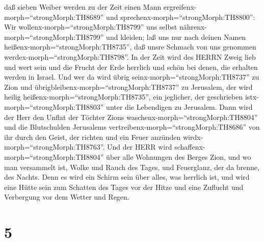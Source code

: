  daß sieben Weiber werden zu der Zeit einen Mann
ergreifenx-morph=``strongMorph:TH8689'' und
sprechenx-morph=``strongMorph:TH8800'': Wir
wollenx-morph=``strongMorph:TH8799'' uns selbst
nährenx-morph=``strongMorph:TH8799'' und kleiden; laß uns nur nach
deinen Namen heißenx-morph=``strongMorph:TH8735'', daß unsre Schmach von
uns genommen werdex-morph=``strongMorph:TH8798''.  In der
Zeit wird des HERRN Zweig lieb und wert sein und die Frucht der Erde
herrlich und schön bei denen, die erhalten werden in Israel.
 Und wer da wird übrig seinx-morph=``strongMorph:TH8737'' zu
Zion und übrigbleibenx-morph=``strongMorph:TH8737'' zu Jerusalem, der
wird heilig heißenx-morph=``strongMorph:TH8735'', ein jeglicher, der
geschrieben istx-morph=``strongMorph:TH8803'' unter die Lebendigen zu
Jerusalem.  Dann wird der Herr den Unflat der Töchter Zions
waschenx-morph=``strongMorph:TH8804'' und die Blutschulden Jerusalems
vertreibenx-morph=``strongMorph:TH8686'' von ihr durch den Geist, der
richten und ein Feuer anzünden wirdx-morph=``strongMorph:TH8763''.
 Und der HERR wird schaffenx-morph=``strongMorph:TH8804''
über alle Wohnungen des Berges Zion, und wo man versammelt ist, Wolke
und Rauch des Tages, und Feuerglanz, der da brenne, des Nachts. Denn es
wird ein Schirm sein über alles, was herrlich ist,  und wird
eine Hütte sein zum Schatten des Tages vor der Hitze und eine Zuflucht
und Verbergung vor dem Wetter und Regen.

\hypertarget{section-4}{%
\section{5}\label{section-4}}

